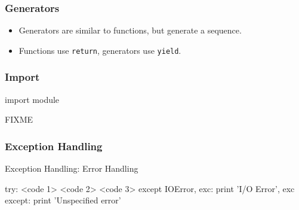\begin{frame}[fragile] %
\frametitle{Generators}

\begin{itemize}
\item Generators are similar to functions, but generate a sequence.
\item Functions use \lstinline{return}, generators use \lstinline{yield}.
\end{itemize}
\end{frame}

\begin{frame}[fragile] %
\frametitle{Import}

\begin{python}
import module

FIXME
\end{python}
\end{frame}

\begin{frame}[fragile] %
\frametitle{Exception Handling}

\begin{block}{Exception Handling: Error Handling}
\begin{python}
try:
    <code 1>
    <code 2>
    <code 3>
except IOError, exc:
    print 'I/O Error', exc
except:
    print 'Unspecified error'
\end{python}
\end{block}

\end{frame}


